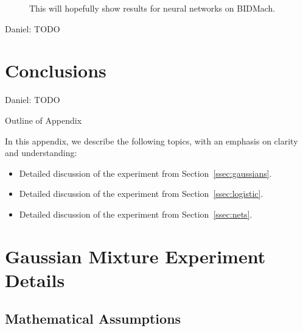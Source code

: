 \documentclass{article}
\begin{document}
\begin{figure}[ht]
  \centering
  \fbox{\rule[-.5cm]{0cm}{4cm} \rule[-.5cm]{4cm}{0cm}}
  \caption{This will hopefully show results for neural networks on BIDMach.}
\end{figure}

{\color{blue}
Daniel: TODO
}




\section{Conclusions}\label{sec:conclusion}

{\color{blue}
Daniel: TODO
}


\small


\normalsize

\clearpage
\appendix

\begin{center}
{\Large Outline of Appendix}
\end{center}

In this appendix, we describe the following topics, with an emphasis on clarity and understanding:

\begin{itemize}[noitemsep]
    \item Detailed discussion of the experiment from Section~\ref{ssec:gaussians}.
    \item Detailed discussion of the experiment from Section~\ref{ssec:logistic}.
    \item Detailed discussion of the experiment from Section~\ref{ssec:nets}.
\end{itemize}

\section{Gaussian Mixture Experiment Details}

\subsection{Mathematical Assumptions}
\end{document}
